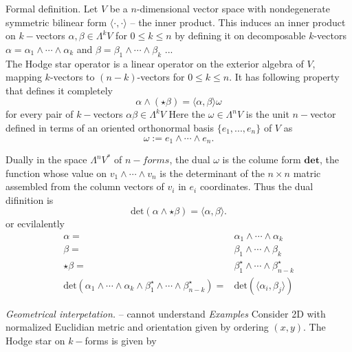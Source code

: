 \documentclass[11pt,a4paper,headinclude=true,DIV=14,BCOR=8mm,chapterprefix,listof=totoc,twoside,openright,abstracton]{scrbook}
\begin{document}
\begin{sidenote}
    Formal definition. Let $V$ be a $n$-dimensional vector space with nondegenerate symmetric bilinear form $\langle\cdot,\cdot\rangle$ -- the inner product. This induces an inner product on $k-$vectors $\alpha,\beta\in\Lambda^k V$ for $0\leq k \leq n$ by defining it on decomposable $k$-vectors $\alpha = \alpha_1\wedge\cdots\wedge\alpha_k$ and $\beta=\beta_1\wedge\cdots\wedge\beta_k$
    ...
    \\
    The Hodge star operator is a linear operator on the exterior algebra of $V$, mapping $k$-vectors to $(n-k)$-vectors for $0\leq k \leq n$. It has following property that defines it completely
    \begin{equation}
        \alpha\wedge(\star\beta) = \langle\alpha,\beta\rangle\omega 
    \end{equation}
    for every pair of $k-$vectors $\alpha\beta\in\Lambda^kV$ Here the $\omega\in\Lambda^nV$ is the unit $n-$vector defined in terms of an oriented orthonormal basis $\{e_1,...,e_n\}$ of $V$ as
    \begin{equation}
        \omega := e_1 \wedge \cdots \wedge e_n.
    \end{equation}
    
    Dually in the space $\Lambda^n V^*$ of $n-forms$, the dual $\omega$ is the colume form $\textbf{det}$, the function whose value on $v_1\wedge\cdots\wedge v_n$ is the determinant of the $n\times n$ matric assembled from the column vectors of $v_i$ in $e_i$ coordinates. Thus the dual difinition is 
    \begin{equation}
       \text{det}(\alpha\wedge\star\beta) = \langle\alpha,\beta\rangle.
    \end{equation}
    or ecvilalently 
    \begin{align}
        \alpha =& \alpha_1\wedge\cdots\wedge\alpha_k \\
        \beta =& \beta_1\wedge\cdots\wedge\beta_k \\
        \star\beta =& \beta_1 ^{\star} \wedge\cdots\wedge \beta_{n-k} ^ {\star} \\
        \text{det}(\alpha_1\wedge\cdots\wedge\alpha_k\wedge\beta_1 ^{\star}\wedge\cdots\wedge\beta_{n-k}^{\star}) =& \text{det}(\langle\alpha_i,\beta_j\rangle)
    \end{align}
    
    \textit{Geometrical interpetation.}  -- cannot understand
    \textit{Examples}
    Consider 2D with normalized Euclidian metric and orientation given by ordering $(x,y)$. The Hodge star on $k-$forms is given by 
    

\end{sidenote}
\end{document}
